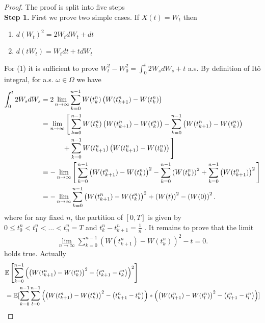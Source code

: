 \begin{proof}
  The proof is split into five steps \\[1ex]
  \textbf{Step 1.} First we prove two simple cases. If $X(t)=W_t$ then 
  \begin{enumerate}
    \item $d(W_t)^2 = 2W_t dW_t + dt $
    \item $d(tW_t) = W_t dt + t dW_t$
  \end{enumerate}
  For (1) it is sufficient to prove $W_t^2 - W_0^2 = \int_0^{t} 2W_s dW_s + t$ a.s. By definition of It\^o integral, for a.s. $\omega  \in \Omega $ we have 
  \begin{align*}
    \int_0^{t}2W_sdW_s &= 2 \lim_{n\to \infty} \sum_{k=0}^{n-1} W(t_k^{n} )\left(W(t_{k+1}^{n})-W(t_k^{n} )\right)\\
                       &= \lim_{n\to \infty} \Bigg[\sum_{k=0}^{n-1} W(t_k^{n})\left(W(t_{k+1}^{n}) - W(t_k^{n} )\right) - \sum_{k=0}^{n-1}\left(W(t_{k+1}^{n})-W(t_k^{n}) \right)  \\
                       & \hspace{1.1cm}+ \sum_{k=0}^{n-1}W(t_{k+1}^{n} )  \left(W(t_{k+1}^{n})-W(t_k^{n} ) \right) \Bigg]\\
                       &= - \lim_{n\to \infty} \Bigg[\sum_{k=0}^{n-1}\left( W(t_{k+1}^{n}) - W(t_k^{n} ) \right)^2 -  \sum_{k=0}^{n-1}\left(W(t_k^{n} )\right)^2 + \sum_{k=0}^{n-1}\left( W(t_{k+1}^n) \right)^2      \Bigg]\\
                       &= - \lim_{n\to \infty} \sum_{k=0}^{n-1}\left( W(t_{k+1}^{n}) - W(t_k^{n} ) \right)^2 +  \left(W(t)\right)^2 - \left( W(0) \right)^2 
  .\end{align*}
  where for any fixed $n$, the partition of $[0,T]$ is given by $0\le t_{0}^{n} < t_{1}^{n} < \ldots <t_n^{n} = T   $ and 
  $t_{k}^{n} - t_{k+1}^{n}   = \frac{1}{n}$ . It remains to prove that the limit 
  \begin{align*}
    \lim_{n\to \infty}\sum_{k=0}^{n-1} \left( W(t_{k+1}^{n} ) - W(t_k^{n} ) \right)^2 - t = 0 
  .\end{align*}
  holds true. Actually 
  \begin{align*}
    &\E \left[ \sum_{k=0}^{n-1}\left( \left( W(t_{k+1}^{n} ) - W(t_k^{n})\right)^2 - \left( t_{k+1}^{n} - t_k^{n}   \right)   \right)^2   \right] \\
    &=\E[\sum_{k=0}^{n-1}\sum_{l=0}^{n-1} \left( \left( W(t_{k+1}^{n} ) - W(t_k^{n})\right)^2 - \left( t_{k+1}^{n} - t_k^{n}   \right)   \right)*\left( \left( W(t_{l+1}^{n} ) - W(t_l^{n})\right)^2 - \left( t_{l+1}^{n} - t_l^{n}   \right)   \right) ]

\end{align*}
\end{proof}
